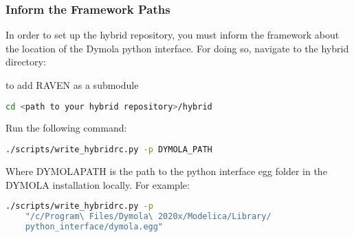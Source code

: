 \subsubsection{Inform the Framework Paths}

In order to set up the hybrid repository, you must inform the framework about the location of the Dymola python interface. For doing so, navigate to the hybrid directory:

to add RAVEN as a submodule
\begin{lstlisting}[language=bash]
cd <path to your hybrid repository>/hybrid
\end{lstlisting}
Run the following command:
\begin{lstlisting}[language=bash]
./scripts/write_hybridrc.py -p DYMOLA_PATH
\end{lstlisting}

Where DYMOLAPATH is the path to the python interface egg folder in the DYMOLA installation locally. For example:
 
\begin{lstlisting}[language=bash]
./scripts/write_hybridrc.py -p 
	"/c/Program\ Files/Dymola\ 2020x/Modelica/Library/
	python_interface/dymola.egg"
\end{lstlisting}
